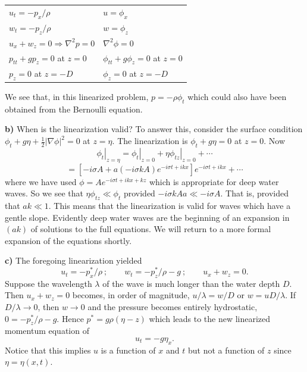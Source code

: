 \sourcepagebreak

\begin{center}
	\begin{tabular}{ll}
		$u_t=-p_x/\rho$                   & $u=\phi_x$                     \\
		$w_t=-p_z/\rho$                   & $w=\phi_z$                     \\
		$u_x+w_z=0\Rightarrow\nabla^2p=0$ & $\nabla^2\phi=0$               \\
		$p_{tt}+gp_z=0$ at $z=0$          & $\phi_{tt}+g\phi_z=0$ at $z=0$ \\
		$p_z=0$ at $z=-D$                 & $\phi_z=0$ at $z=-D$
	\end{tabular}
\end{center}
We see that, in this linearized problem, $p=-\rho\phi_t$ which could also have been obtained
from the Bernoulli equation.

\textbf{b)} When is the linearization valid? To answer this, consider the surface condition
$\phi_t+g\eta+\frac12|\nabla\phi|^2=0$ at $z=\eta$. The linearization is
$\phi_t+g\eta=0$ at $z=0$. Now
\[
	\left.\phi_t\right|_{z=\eta}
	=\left.\phi_t\right|_{z=0}+\left.\eta\phi_{tz}\right|_{z=0}+\cdots
\]
\[
	=\left[-i\sigma A+a(-i\sigma kA)e^{-i\sigma t+ikx}\right]e^{-i\sigma t+ikx}+\cdots
\]
where we have used $\phi=Ae^{-i\sigma t+ikx+kz}$ which is appropriate for deep water waves. So
we see that $\eta\phi_{tz}\ll\phi_t$ provided $-i\sigma kAa\ll-i\sigma A$. That is, provided that
$ak\ll1$. This means that the linearization is valid for waves which have a gentle slope. Evidently
deep water waves are the beginning of an expansion in $(ak)$ of solutions to the full
equations. We will return to a more formal expansion of the equations shortly.

\textbf{c)} The foregoing linearization yielded
\[
	u_t=-p_x^*/\rho\ ;\qquad w_t=-p_z^*/\rho-g\ ;\qquad u_x+w_z=0.
\]
Suppose the wavelength $\lambda$ of the wave is much longer than the water depth $D$. Then
$u_x+w_z=0$ becomes, in order of magnitude, $u/\lambda=w/D$ or $w=uD/\lambda$. If $D/\lambda\to0$,
then $w\to0$ and the pressure becomes entirely hydrostatic, $0=-p_z^*/\rho-g$. Hence
$p^*=g\rho(\eta-z)$ which leads to the new linearized momentum equation of
\[
	u_t=-g\eta_x.
\]
Notice that this implies $u$ is a function of $x$ and $t$ but not a function of $z$ since
$\eta=\eta(x,t)$.

